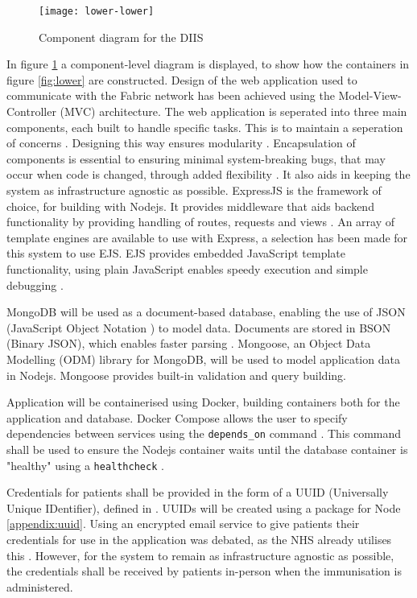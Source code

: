 \begin{figure}[H]
  \texttt{[image: lower-lower]}
  \caption{Component diagram for the DIIS}
  \label{fig:lower-lower}
\end{figure}

In figure \ref{fig:lower-lower} a component-level diagram is displayed, to show how the containers in figure \ref{fig:lower} are constructed. 
Design of the web application used to communicate with the Fabric network has been achieved using the Model-View-Controller (MVC) architecture. 
The web application is seperated into three main components, each built to handle specific tasks. 
This is to maintain a seperation of concerns \cite{richards_software_2015}.
Designing this way ensures modularity \cite{laplante_what_2007}.
Encapsulation of components is essential to ensuring minimal system-breaking bugs, that may occur when code is changed, through added flexibility \cite{leff_web_application_2001}.
It also aids in keeping the system as infrastructure agnostic as possible.
ExpressJS is the framework of choice, for building with Nodejs. 
It provides middleware that aids backend functionality by providing handling of routes, requests and views \cite{noauthor_express_nodate}.
An array of template engines are available to use with Express, a selection has been made for this system to use EJS.
EJS provides embedded JavaScript template functionality, using plain JavaScript enables speedy execution and simple debugging \cite{noauthor_ejs_nodate}.

MongoDB will be used as a document-based database, enabling the use of JSON (JavaScript Object Notation \cite{noauthor_json_nodate}) to model data. 
Documents are stored in BSON (Binary JSON), which enables faster parsing \cite{noauthor_json_bson_nodate}. 
Mongoose, an Object Data Modelling (ODM) library for MongoDB, will be used to model application data in Nodejs. Mongoose provides built-in validation and query building. \cite{noauthor_mongoose_nodate} 

Application will be containerised using Docker, building containers both for the application and database. 
Docker Compose allows the user to specify dependencies between services using the \lstinline{depends_on} command \cite{noauthor_compose_2021}. 
This command shall be used to ensure the Nodejs container waits until the database container is "healthy" using a \lstinline{healthcheck} \cite{noauthor_compose_2021}.

Credentials for patients shall be provided in the form of a UUID (Universally Unique IDentifier), defined in \cite{noauthor_rfc4122_nodate}.
UUIDs will be created using a package for Node \ref{appendix:uuid}. 
Using an encrypted email service to give patients their credentials for use in the application was debated, as the NHS already utilises this \cite{noauthor_guidance_nodate}. 
However, for the system to remain as infrastructure agnostic as possible, the credentials shall be received by patients in-person when the immunisation is administered.

